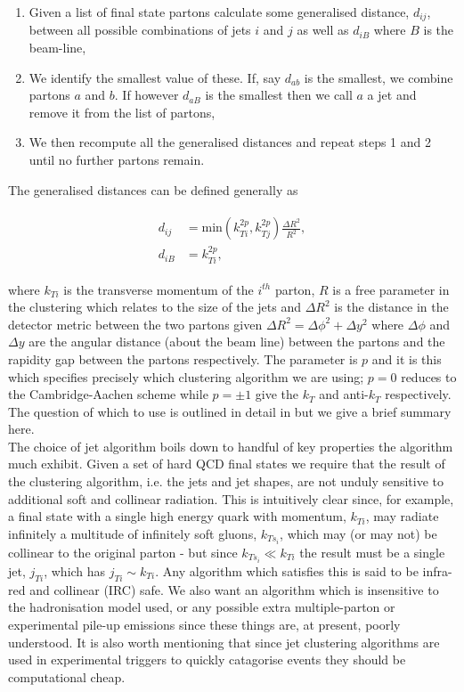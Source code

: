 	\begin{enumerate}
		\item Given a list of final state partons calculate some generalised distance, $d_{ij}$, between all possible
		      combinations of jets $i$ and $j$ as well as $d_{iB}$ where $B$ is the beam-line,
		\item We identify the smallest value of these.  If, say $d_{ab}$ is the smallest, we combine partons $a$ and $b$.
		      If however $d_{aB}$ is the smallest then we call $a$ a jet and remove it from the list of partons,
		\item We then recompute all the generalised distances and repeat steps 1 and 2 until no further partons remain.
	\end{enumerate}

	The generalised distances can be defined generally as

	\begin{align}
	\begin{split}
		d_{ij} &= \text{min}(k_{Ti}^{2p}, k_{Tj}^{2p})\frac{\Delta R^2}{R^2},\\
		d_{iB} &= k_{Ti}^{2p},
	\end{split}
	\end{align}

	where $k_{Ti}$ is the transverse momentum of the $i^{th}$ parton, $R$ is a free parameter in the clustering which relates
	to the size of the jets and $\Delta R^2$ is the distance in the detector metric between the two partons given
	$\Delta R^2 = \Delta\phi^2 + \Delta y^2$ where $\Delta\phi$ and $\Delta y$ are the angular distance (about the beam line)
	between the partons and the rapidity gap between the partons respectively.  The parameter is $p$ and it is this which
	specifies precisely which clustering algorithm we are using; $p=0$ reduces to the Cambridge-Aachen scheme while
	$p=\pm1$ give the $k_T$ and anti-$k_T$ respectively.  The question of which to use is outlined in detail in
	\cite{Cacciari:2008gp} but we give a brief summary here.\\The choice of jet algorithm boils down to handful of key
	properties the algorithm much exhibit.  Given a set of hard QCD final states we require that the result of the
	clustering algorithm, i.e. the jets and jet shapes, are not unduly sensitive to additional soft and collinear radiation.
	This is intuitively clear since, for example, a final state with a single high energy quark with momentum, $k_{Ti}$,
	may radiate infinitely a multitude of infinitely soft gluons, $k_{Ts_i}$, which may (or may not) be collinear to the
	original parton - but since $k_{Ts_i}\ll k_{Ti}$ the result must be a single jet, $j_{Ti}$, which has $j_{Ti}\sim k_{Ti}$.
	Any algorithm which satisfies this is said to be infra-red and collinear (IRC) safe.  We also want an algorithm which
	is insensitive to the hadronisation model used, or any possible extra multiple-parton or experimental pile-up emissions
	since these things are, at present, poorly understood.  It is also worth mentioning that since jet clustering algorithms
	are used in experimental triggers to quickly catagorise events they should be computational cheap.

